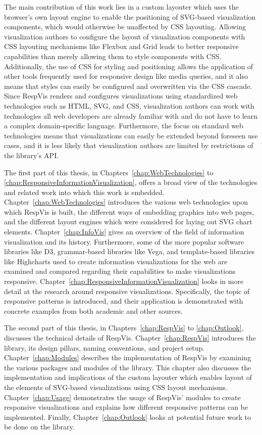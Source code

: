 The main contribution of this work lies in a custom layouter which
uses the browser's own layout engine to enable the positioning of
SVG-based visualization components, which would otherwise be
unaffected by CSS layouting. Allowing visualization authors to
configure the layout of visualization components with CSS layouting
mechanisms like Flexbox and Grid leads to better responsive
capabilities than merely allowing them to style components with CSS.
Additionally, the use of CSS for styling and positioning allows the
application of other tools frequently used for responsive design like
media queries, and it also means that styles can easily be configured
and overwritten via the CSS cascade. Since RespVis renders and
configures visualizations using standardized web technologies such as
HTML, SVG, and CSS, visualization authors can work with technologies
all web developers are already familiar with and do not have to learn
a complex domain-specific language. Furthermore, the focus on standard
web technologies means that visualizations can easily be extended
beyond foreseen use cases, and it is less likely that visualization
authors are limited by restrictions of the library's API.



The first part of this thesis, in Chapters~\ref{chap:WebTechnologies}
to \ref{chap:ResponsiveInformationVisualization}, offers a broad view
of the technologies and related work into which this work is
embedded. Chapter~\ref{chap:WebTechnologies} introduces the various
web technologies upon which RespVis is built, the different ways of
embedding graphics into web pages, and the different layout engines
which were considered for laying out SVG chart elements.
Chapter~\ref{chap:InfoVis} gives an overview of the field of
information visualization and its history. Furthermore, some of the
more popular software libraries like D3, grammar-based libraries like
Vega, and template-based libraries like Highcharts used to create
information visualizations for the web are examined and compared
regarding their capabilities to make visualizations responsive.
Chapter~\ref{chap:ResponsiveInformationVisualization} looks in more
detail at the research around responsive visualizations.
Specifically, the topic of responsive patterns is introduced, and
their application is demonstrated with concrete examples from both
academic and other sources.

The second part of this thesis, in Chapters~\ref{chap:RespVis} to
\ref{chap:Outlook}, discusses the technical details of RespVis.
Chapter~\ref{chap:RespVis} introduces the library, its design pillars,
naming conventions, and project setup. Chapter~\ref{chap:Modules}
describes the implementation of RespVis by examining the various
packages and modules of the library. This chapter also discusses the
implementation and implications of the custom layouter which enables
layout of the elements of SVG-based visualizations using CSS layout
mechanisms. Chapter~\ref{chap:Usage} demonstrates the usage of
RespVis' modules to create responsive visualizations and explains how
different responsive patterns can be implemented. Finally,
Chapter~\ref{chap:Outlook} looks at potential future work to be done
on the library.

